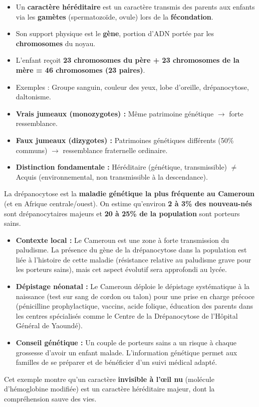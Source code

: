 \documentclass[11pt]{article}
\begin{document}
\begin{aretenir}
\begin{itemize}
    \item Un \textbf{caractère héréditaire} est un caractère transmis des parents aux enfants via les \textbf{gamètes} (spermatozoïde, ovule) lors de la \textbf{fécondation}.
    \item Son support physique est le \textbf{gène}, portion d'ADN portée par les \textbf{chromosomes} du noyau.
    \item L'enfant reçoit \textbf{23 chromosomes du père + 23 chromosomes de la mère = 46 chromosomes (23 paires)}.
    \item Exemples : Groupe sanguin, couleur des yeux, lobe d'oreille, drépanocytose, daltonisme.
    \item \textbf{Vrais jumeaux (monozygotes) :} Même patrimoine génétique $\to$ forte ressemblance.
    \item \textbf{Faux jumeaux (dizygotes) :} Patrimoines génétiques différents (50\% communs) $\to$ ressemblance fraternelle ordinaire.
    \item \textbf{Distinction fondamentale :} Héréditaire (génétique, transmissible) $\neq$ Acquis (environnemental, non transmissible à la descendance).
\end{itemize}
\end{aretenir}

\begin{savaistu}
La drépanocytose est la \textbf{maladie génétique la plus fréquente au Cameroun} (et en Afrique centrale/ouest). On estime qu'environ \textbf{2 à 3\% des nouveau-nés} sont drépanocytaires majeurs et \textbf{20 à 25\% de la population} sont porteurs sains.
\begin{itemize}
    \item \textbf{Contexte local :} Le Cameroun est une zone à forte transmission du paludisme. La présence du gène de la drépanocytose dans la population est liée à l'histoire de cette maladie (résistance relative au paludisme grave pour les porteurs sains), mais cet aspect évolutif sera approfondi au lycée.
    \item \textbf{Dépistage néonatal :} Le Cameroun déploie le dépistage systématique à la naissance (test sur sang de cordon ou talon) pour une prise en charge précoce (pénicilline prophylactique, vaccins, acide folique, éducation des parents dans les centres spécialisés comme le Centre de la Drépanocytose de l'Hôpital Général de Yaoundé).
    \item \textbf{Conseil génétique :} Un couple de porteurs sains a un risque à chaque grossesse d'avoir un enfant malade. L'information génétique permet aux familles de se préparer et de bénéficier d'un suivi médical adapté.
\end{itemize}
Cet exemple montre qu'un caractère \textbf{invisible à l'œil nu} (molécule d'hémoglobine modifiée) est un caractère héréditaire majeur, dont la compréhension sauve des vies.
\end{savaistu}
\end{document}
